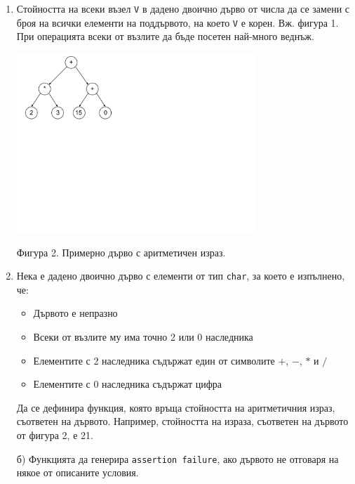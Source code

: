 \documentclass[12pt,a4paper]{article}
\begin{document}
\begin{enumerate}
	\item Стойността на всеки възел \texttt{V} в дадено двоично дърво от числа да се замени с броя на всички елементи на поддървото, на което \texttt{V} е корен. Вж. фигура 1. При операцията всеки от възлите да бъде посетен най-много веднъж.


	\begin{flushleft}
	\includegraphics[width=9cm]{images/tree2}

	\vspace{-100px}

	Фигура 2. Примерно дърво с аритметичен израз.
	\end{flushleft}


	\item Нека е дадено двоично дърво с елементи от тип \texttt{char}, за което е изпълнено, че:

	\begin{itemize}
		\item Дървото е непразно
		\item Всеки от възлите му има точно 2 или 0 наследника
		\item Елементите с 2 наследника съдържат един от символите $+$, $-$, $*$ и $/$
		\item Елементите с 0 наследника съдържат цифра
	\end{itemize}

	Да се дефинира функция, която връща стойността на аритметичния израз, съответен на дървото. Например, стойността на израза, съответен на дървото от фигура 2, е 21.

	б) Функцията да генерира \texttt{assertion failure}, ако дървото не отговаря на някое от описаните условия.





\end{enumerate}
\end{document}
